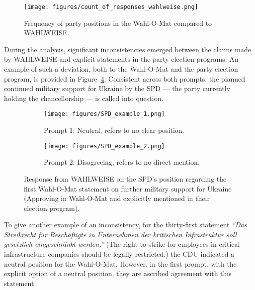 \documentclass[
	fontsize=10pt,          %
	numbers=noenddot,    	%
    parskip=half,        	%
    listof=totoc,        	%
    bibliography=totoc,  	%
	headsepline=true,       %
	footsepline=false, 		%
    DIV=12                	%
]{scrartcl}
\begin{document}
\begin{figure}[h]
    \centering
    \texttt{[image: figures/count\_of\_responses\_wahlweise.png]}
    \caption{Frequency of party positions in the Wahl-O-Mat compared to WAHLWEISE.}
    \label{fig:counts_wahlweise}
\end{figure}

During the analysis, significant inconsistencies emerged between the claims made by WAHLWEISE and explicit statements in the party election programs. An example of such a deviation, both to the Wahl-O-Mat and the party election program, is provided in Figure~\ref{fig:spd_example}. Consistent across both prompts, the planned continued military support for Ukraine by the SPD  --- the party currently holding the chancellorship --- is called into question.

\begin{figure}[htbp]
  \centering
  \begin{subfigure}[b]{0.49\textwidth}
    \centering
    \texttt{[image: figures/SPD\_example\_1.png]}
    \caption{Prompt 1: Neutral, refers to no clear position.}
    \label{fig:spd_first}
  \end{subfigure}
  \hfill
  \begin{subfigure}[b]{0.49\textwidth}
    \centering
    \texttt{[image: figures/SPD\_example\_2.png]} 
    \caption{Prompt 2: Disagreeing, refers to no direct mention.}
    \label{fig:spd_second}
  \end{subfigure}
  
  \caption{Response from WAHLWEISE on the SPD's position regarding the first Wahl-O-Mat statement on further military support for Ukraine (Approving in Wahl-O-Mat and explicitly mentioned in their election program).}
  \label{fig:spd_example}
\end{figure}

To give another example of an inconsistency, for the thirty-first statement \emph{``Das Streikrecht f\"ur Besch\"aftigte in Unternehmen der kritischen Infrastruktur soll gesetzlich eingeschr\"ankt werden.''} (The right to strike for employees in critical infrastructure companies should be legally restricted.) the CDU indicated a neutral position for the Wahl-O-Mat.
However, in the first prompt, with the explicit option of a neutral position, they are ascribed agreement with this statement
\end{document}
